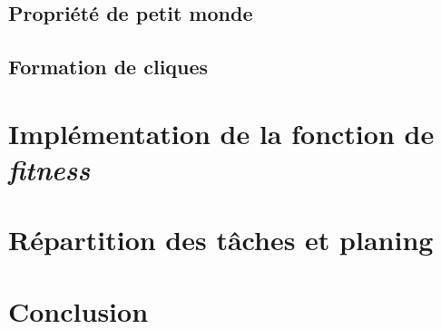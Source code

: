 \subsection{Propriété de petit monde}

\subsection{Formation de cliques}


\section{Implémentation de la fonction de \textit{fitness}}


\section{Répartition des tâches et planing}


\section{Conclusion}

